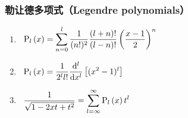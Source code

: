 \documentclass[12pt,a4paper]{article}
\newcommand\dif{\mathrm{d}}
\renewcommand{\[}{\ $\displaystyle}
\renewcommand{\]}{$\ }%
\newcommand{\summ}[2][n]{\sum_{#1=#2}^\infty}
\begin{document}
	  \subsubsection{勒让德多项式（Legendre polynomials）}
		\begin{enumerate}
			\item \[
		 	  \fp{x} = \sum_{n=0}^l \frac{1}{(n!)^2}\frac{(l+n)!}{(l-n)!}\left(\frac{x-1}2\right)^n 
		 	\]
		 	\item \[
		 	  \fp{x} = \frac{1}{2^l l!}\frac{\dif^l}{\dif x^l}\left[(x^2 - 1)^l\right]
		 	\]
		 	\item \[
		 		  \frac{1}{\sqrt{1 - 2xt + t^2}} = \summ[l]{\infty} \fp{x}t^l 
		 		\]
		\end{enumerate}
		
\end{document}
